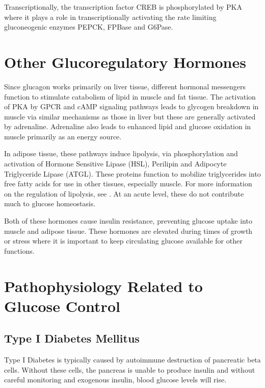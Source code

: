 \documentclass{tufte-handout}
\begin{document}
Transcriptionally, the transcription factor CREB is phosphorylated by PKA where it plays a role in transcriptionally activating the rate limiting gluconeogenic enzymes PEPCK, FPBase and G6Pase.

\section{Other Glucoregulatory Hormones}

Since glucagon works primarily on liver tissue, different hormonal messengers function to stimulate catabolism of lipid in muscle and fat tissue.  The activation of PKA by GPCR and cAMP signaling pathways leads to glycogen breakdown in muscle via similar mechanisms as those in liver but these are generally activated by adrenaline.  Adrenaline also leads to enhanced lipid and glucose oxidation in muscle primarily as an energy source.

In adipose tissue, these pathways induce lipolysis, via phosphorylation and activation of Hormone Sensitive Lipase (HSL), Perilipin and Adipocyte Triglyceride Lipase (ATGL).  These proteins function to mobilize triglycerides into free fatty acids for use in other tissues, especially muscle.  For more information on the regulation of lipolysis, see \cite{Young2013}.  At an acute level, these do not contribute much to glucose homeostasis.

  Both of these hormones cause insulin resistance, preventing glucose uptake into muscle and adipose tissue.  These hormones are elevated during times of growth or stress where it is important to keep circulating glucose available for other functions.

\section{Pathophysiology Related to Glucose Control}

\subsection{Type I Diabetes Mellitus}

Type I Diabetes is typically caused by autoimmune destruction of pancreatic beta cells.  Without these cells, the pancreas is unable to produce insulin and without careful monitoring and exogenous insulin, blood glucose levels will rise.
\end{document}
